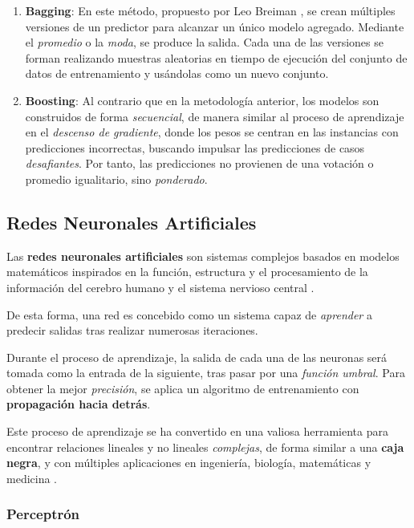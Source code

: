 \begin{enumerate}
    \item \textbf{Bagging}: En este método, propuesto por Leo Breiman \cite{Breiman1996BaggingPredictors}, se crean múltiples versiones de un predictor para alcanzar un único modelo agregado. Mediante el \textit{promedio} o la \textit{moda}, se produce la salida. Cada una de las versiones se forman realizando muestras aleatorias en tiempo de ejecución del conjunto de datos de entrenamiento y usándolas como un nuevo conjunto.
    \item \textbf{Boosting}: Al contrario que en la metodología anterior, los modelos son construidos de forma \textit{secuencial}, de manera similar al proceso de aprendizaje en el \textit{descenso de gradiente}, donde los pesos se centran en las instancias con predicciones incorrectas, buscando impulsar las predicciones de casos \textit{desafiantes}. Por tanto, las predicciones no provienen de una votación o promedio igualitario, sino \textit{ponderado}.
\end{enumerate}


\subsection{Redes Neuronales Artificiales}

Las \textbf{redes neuronales artificiales} son sistemas complejos basados en modelos matemáticos inspirados en la función, estructura y el procesamiento de la información del cerebro humano y el sistema nervioso central \cite{Huang2022AutomaticNetworks}.

De esta forma, una red es concebido como un sistema capaz de \textit{aprender} a predecir salidas tras realizar numerosas iteraciones.

Durante el proceso de aprendizaje, la salida de cada una de las neuronas será tomada como la entrada de la siguiente, tras pasar por una \textit{función umbral}. Para obtener la mejor \textit{precisión}, se aplica un algoritmo de entrenamiento con \textbf{propagación hacia detrás}.

Este proceso de aprendizaje se ha convertido en una valiosa herramienta para encontrar relaciones lineales y no lineales \textit{complejas}, de forma similar a una \textbf{caja negra}, y con múltiples aplicaciones en ingeniería, biología, matemáticas y medicina \cite{Moayedi2020AApplications}.

\subsubsection{Perceptrón}

